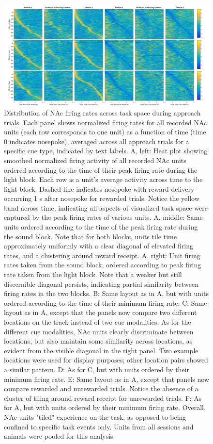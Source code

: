 \documentclass[11pt]{article}
\begin{document}
\begin{figure}[h]
\centering
\includegraphics[width=\textwidth]{Fig 11 - NP task tiling.png}
\caption{Distribution of NAc firing rates across task space during approach trials. Each panel shows normalized firing rates for all recorded NAc units (each row corresponds to one unit) as a function of time (time 0 indicates nosepoke), averaged across all approach trials for a specific cue type, indicated by text labels. A, left: Heat plot showing smoothed normalized firing activity of all recorded NAc units ordered according to the time of their peak firing rate during the light block. Each row is a unit’s average activity across time to the light block. Dashed line indicates nosepoke with reward delivery occurring 1 s after nosepoke for rewarded trials. Notice the yellow band across time, indicating all aspects of visualized task space were captured by the peak firing rates of various units. A, middle: Same units ordered according to the time of the peak firing rate during the sound block. Note that for both blocks, units tile time approximately uniformly with a clear diagonal of elevated firing rates, and a clustering around reward receipt. A, right: Unit firing rates taken from the sound block, ordered according to peak firing rate taken from the light block. Note that a weaker but still discernible diagonal persists, indicating partial similarity between firing rates in the two blocks. B: Same layout as in A, but with units ordered according to the time of their minimum firing rate. C: Same layout as in A, except that the panels now compare two different locations on the track instead of two cue modalities. As for the different cue modalities, NAc units clearly discriminate between locations, but also maintain some similarity across locations, as evident from the visible diagonal in the right panel. Two example locations were used for display purposes; other location pairs showed a similar pattern. D: As for C, but with units ordered by their minimum firing rate. E: Same layout as in A, except that panels now compare rewarded and unrewarded trials. Notice the absence of a cluster of tiling around reward receipt for unrewarded trials. F: As for A, but with units ordered by their minimum firing rate. Overall, NAc units "tiled" experience on the task, as opposed to being confined to specific task events only. Units from all sessions and animals were pooled for this analysis.}
\label{fig:NP_tiling}
\end{figure}
\end{document}
